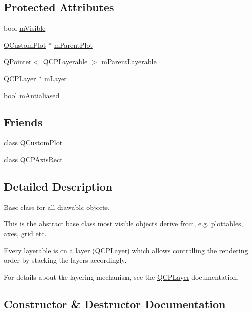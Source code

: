 \subsection*{Protected Attributes}
\begin{DoxyCompactItemize}
\item 
bool \hyperlink{class_q_c_p_layerable_a62e3aed8427d6ce3ccf716f285106cb3}{m\+Visible}
\item 
\hyperlink{class_q_custom_plot}{Q\+Custom\+Plot} $\ast$ \hyperlink{class_q_c_p_layerable_aa2a528433e44db02b8aef23c1f9f90ed}{m\+Parent\+Plot}
\item 
Q\+Pointer$<$ \hyperlink{class_q_c_p_layerable}{Q\+C\+P\+Layerable} $>$ \hyperlink{class_q_c_p_layerable_a3291445a980053e2d17a21d15957624e}{m\+Parent\+Layerable}
\item 
\hyperlink{class_q_c_p_layer}{Q\+C\+P\+Layer} $\ast$ \hyperlink{class_q_c_p_layerable_aa38ec5891aff0f50b36fd63e9372a0cd}{m\+Layer}
\item 
bool \hyperlink{class_q_c_p_layerable_a3ab45a4c76a3333ce42eb217a81733ec}{m\+Antialiased}
\end{DoxyCompactItemize}
\subsection*{Friends}
\begin{DoxyCompactItemize}
\item 
class \hyperlink{class_q_c_p_layerable_a1cdf9df76adcfae45261690aa0ca2198}{Q\+Custom\+Plot}
\item 
class \hyperlink{class_q_c_p_layerable_acbf20ecb140f66c5fd1bc64ae0762990}{Q\+C\+P\+Axis\+Rect}
\end{DoxyCompactItemize}


\subsection{Detailed Description}
Base class for all drawable objects. 

This is the abstract base class most visible objects derive from, e.\+g. plottables, axes, grid etc.

Every layerable is on a layer (\hyperlink{class_q_c_p_layer}{Q\+C\+P\+Layer}) which allows controlling the rendering order by stacking the layers accordingly.

For details about the layering mechanism, see the \hyperlink{class_q_c_p_layer}{Q\+C\+P\+Layer} documentation. 

\subsection{Constructor \& Destructor Documentation}
\hypertarget{class_q_c_p_layerable_a74c0fa237f29bf0e49565013fc5d1ec0}{}
